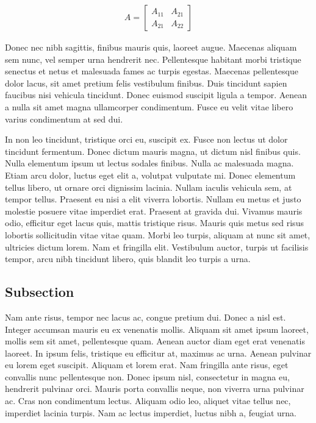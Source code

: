 \documentclass[10pt, a4paper, twocolumn]{article}
\begin{document}
\begin{align}
	A =
	\begin{bmatrix}
		A_{11} & A_{21} \\
		A_{21} & A_{22}
	\end{bmatrix}
\end{align}

Donec nec nibh sagittis, finibus mauris quis, laoreet augue. Maecenas aliquam
sem nunc, vel semper urna hendrerit nec. Pellentesque habitant morbi tristique
senectus et netus et malesuada fames ac turpis egestas. Maecenas pellentesque
dolor lacus, sit amet pretium felis vestibulum finibus. Duis tincidunt sapien
faucibus nisi vehicula tincidunt. Donec euismod suscipit ligula a tempor.
Aenean a nulla sit amet magna ullamcorper condimentum. Fusce eu velit vitae
libero varius condimentum at sed dui.

In non leo tincidunt, tristique orci eu, suscipit ex. Fusce non lectus ut dolor
tincidunt fermentum. Donec dictum mauris magna, ut dictum nisl finibus quis.
Nulla elementum ipsum ut lectus sodales finibus. Nulla ac malesuada magna.
Etiam arcu dolor, luctus eget elit a, volutpat vulputate mi. Donec elementum
tellus libero, ut ornare orci dignissim lacinia. Nullam iaculis vehicula sem,
at tempor tellus. Praesent eu nisi a elit viverra lobortis. Nullam eu metus et
justo molestie posuere vitae imperdiet erat. Praesent at gravida dui. Vivamus
mauris odio, efficitur eget lacus quis, mattis tristique risus. Mauris quis
metus sed risus lobortis sollicitudin vitae vitae quam. Morbi leo turpis,
aliquam at nunc sit amet, ultricies dictum lorem. Nam et fringilla elit.
Vestibulum auctor, turpis ut facilisis tempor, arcu nibh tincidunt libero, quis
blandit leo turpis a urna.

\subsection{Subsection}

Nam ante risus, tempor nec lacus ac, congue pretium dui. Donec a nisl est.
Integer accumsan mauris eu ex venenatis mollis. Aliquam sit amet ipsum laoreet,
mollis sem sit amet, pellentesque quam. Aenean auctor diam eget erat venenatis
laoreet. In ipsum felis, tristique eu efficitur at, maximus ac urna. Aenean
pulvinar eu lorem eget suscipit. Aliquam et lorem erat. Nam fringilla ante
risus, eget convallis nunc pellentesque non. Donec ipsum nisl, consectetur in
magna eu, hendrerit pulvinar orci. Mauris porta convallis neque, non viverra
urna pulvinar ac. Cras non condimentum lectus. Aliquam odio leo, aliquet vitae
tellus nec, imperdiet lacinia turpis. Nam ac lectus imperdiet, luctus nibh a,
feugiat urna.
\end{document}
